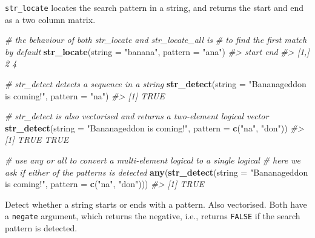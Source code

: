 \documentclass[]{book}
\newenvironment{Shaded}{}{}
\newcommand{\CommentTok}[1]{\textcolor[rgb]{0.38,0.63,0.69}{\textit{#1}}}
\newcommand{\DataTypeTok}[1]{\textcolor[rgb]{0.56,0.13,0.00}{#1}}
\newcommand{\KeywordTok}[1]{\textcolor[rgb]{0.00,0.44,0.13}{\textbf{#1}}}
\newcommand{\NormalTok}[1]{#1}
\newcommand{\StringTok}[1]{\textcolor[rgb]{0.25,0.44,0.63}{#1}}
\begin{document}
\texttt{str\_locate} locates the search pattern in a string, and returns the start and end as a two column matrix.

\begin{Shaded}
\begin{Highlighting}[]
\CommentTok{# the behaviour of both str_locate and str_locate_all is}
\CommentTok{# to find the first match by default}
\KeywordTok{str_locate}\NormalTok{(}\DataTypeTok{string =} \StringTok{"banana"}\NormalTok{, }\DataTypeTok{pattern =} \StringTok{"ana"}\NormalTok{)}
\CommentTok{#>      start end}
\CommentTok{#> [1,]     2   4}
\end{Highlighting}
\end{Shaded}

\begin{Shaded}
\begin{Highlighting}[]
\CommentTok{# str_detect detects a sequence in a string}
\KeywordTok{str_detect}\NormalTok{(}\DataTypeTok{string =} \StringTok{"Bananageddon is coming!"}\NormalTok{,}
           \DataTypeTok{pattern =} \StringTok{"na"}\NormalTok{)}
\CommentTok{#> [1] TRUE}

\CommentTok{# str_detect is also vectorised and returns a two-element logical vector}
\KeywordTok{str_detect}\NormalTok{(}\DataTypeTok{string =} \StringTok{"Bananageddon is coming!"}\NormalTok{,}
           \DataTypeTok{pattern =} \KeywordTok{c}\NormalTok{(}\StringTok{"na"}\NormalTok{, }\StringTok{"don"}\NormalTok{))}
\CommentTok{#> [1] TRUE TRUE}

\CommentTok{# use any or all to convert a multi-element logical to a single logical}
\CommentTok{# here we ask if either of the patterns is detected}
\KeywordTok{any}\NormalTok{(}\KeywordTok{str_detect}\NormalTok{(}\DataTypeTok{string =} \StringTok{"Bananageddon is coming!"}\NormalTok{,}
               \DataTypeTok{pattern =} \KeywordTok{c}\NormalTok{(}\StringTok{"na"}\NormalTok{, }\StringTok{"don"}\NormalTok{)))}
\CommentTok{#> [1] TRUE}
\end{Highlighting}
\end{Shaded}

Detect whether a string starts or ends with a pattern. Also vectorised.
Both have a \texttt{negate} argument, which returns the negative, i.e., returns \texttt{FALSE} if the search pattern is detected.
\end{document}
